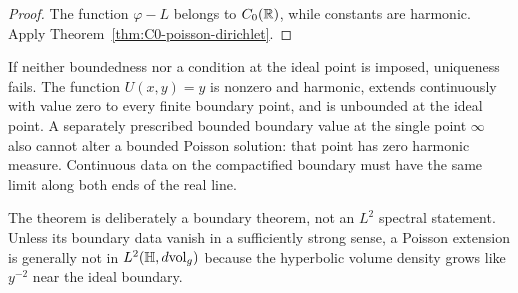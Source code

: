 \begin{proof}
The function $\varphi-L$ belongs to $C_0(\mathbb{R})$, while constants are harmonic.
Apply Theorem~\ref{thm:C0-poisson-dirichlet}.
\end{proof}

\begin{warning}
\label{warn:dirichlet-uniqueness-class}
If neither boundedness nor a condition at the ideal point is imposed,
uniqueness fails.  The function $U(x,y)=y$ is nonzero and harmonic, extends
continuously with value zero to every finite boundary point, and is unbounded
at the ideal point.  A separately prescribed bounded boundary value at the
single point $\infty$ also cannot alter a bounded Poisson solution: that point
has zero harmonic measure.  Continuous data on the compactified boundary must
have the same limit along both ends of the real line.
\end{warning}

The theorem is deliberately a boundary theorem, not an $L^2$ spectral
statement.  Unless its boundary data vanish in a sufficiently strong sense, a
Poisson extension is generally not in $L^2(\mathbb{H},d\mathrm{vol}_g)$ because the
hyperbolic volume density grows like $y^{-2}$ near the ideal boundary.
